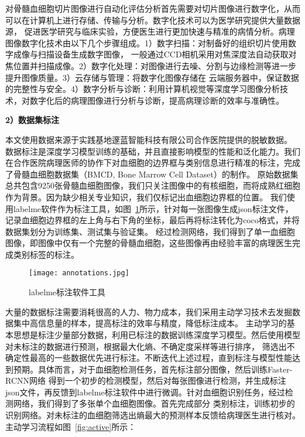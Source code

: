 对骨髓血细胞切片图像进行自动化评估分析首先需要对切片图像进行数字化\cite{fuxinyan2022}，从而可以在计算机上进行存储、传输与分析。数字化技术可以为医学研究提供大量数据源，
促进医学研究与临床实验，方便医生进行更加快速与精准的病情分析。病理图像数字化技术由以下几个步骤组成。1）数字扫描：对制备好的组织切片使用数字成像与扫描设备生成数字图像，
一般通过CCD相机采用对焦深度法自动获取对焦位置并扫描成像。2）数字化处理：对图像进行去噪、分割与边缘检测等进一步提升图像质量。3）云存储与管理：将数字化图像存储在
云端服务器中，保证数据的完整性与安全。4）数字分析与诊断：利用计算机视觉等深度学习图像分析技术，对数字化后的病理图像进行分析与诊断，提高病理诊断的效率与准确性。

\textbf{2）数据集标注}

本文使用数据来源于实践基地邃蓝智能科技有限公司合作医院提供的脱敏数据。
数据标注是深度学习模型训练的基础，并且直接影响模型的性能和泛化能力。我们在合作医院病理医师的协作下对血细胞的边界框与类别信息进行精准的标注，完成了骨髓血细胞数据集（BMCD, Bone Marrow Cell Dataset）的制作。
原始数据集总共包含9250张骨髓血细胞图像，我们只关注图像中的有核细胞，而将成熟红细胞作为背景。因为缺少相关专业知识，我们仅标记出血细胞边界框的位置。
我们使用labelme软件作为标注工具，如图~\ref{fig:annotations}所示，针对每一张图像生成json标注文件，记录血细胞边界框的左上角与右下角的坐标，最后再将标注转化为coco格式，并将数据集划分为训练集、测试集与验证集。
经过检测网络，我们得到了单一血细胞图像，即图像中仅有一个完整的骨髓血细胞，这些图像再由经验丰富的病理医生完成类别标签的标注。

\begin{figure}[htbp]
  \centering
  \texttt{[image: annotations.jpg]}
  \caption{labelme标注软件工具}
  \label{fig:annotations}
\end{figure}

大量的数据标注需要消耗很高的人力、物力成本，我们采用主动学习\cite{ren2021survey}技术去发掘数据集中高信息量的样本，提高标注的效率与精度，降低标注成本。
主动学习的基本思想是标注少量部分数据，利用已标注的数据训练深度学习模型。然后使用模型对未标注的数据进行预测，根据最大化熵、不确定度采样等进行排序，
筛选出不确定性最高的一些数据优先进行标注。不断迭代上述过程，直到标注与模型性能达到预期。具体而言，对于血细胞检测任务，首先标注部分图像，然后训练Faster-RCNN网络
得到一个初步的检测模型，然后对每张图像进行检测，并生成标注json文件，再反馈到labelme标注软件中进行微调。针对血细胞识别任务，经过检测网络，我们得到了多张单个血细胞图像。首先完成部分
类别标注，训练初步的识别网络。对未标注的血细胞筛选出熵最大的预测样本反馈给病理医生进行核对。主动学习流程如图~\ref{fig:active}所示：

